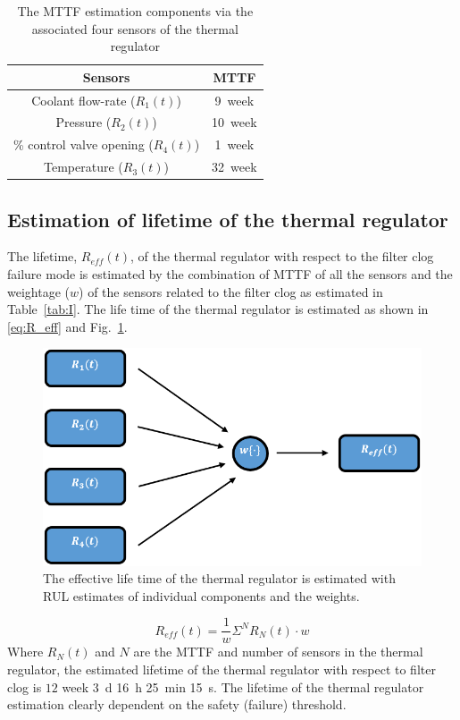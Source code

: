 \documentclass[conference]{IEEEtran}
\begin{document}
\begin{table}[b]
    \caption{The MTTF estimation components via the associated four sensors of the thermal regulator}
    \begin{center}
        \begin{tabular}{|c|c|}
            \hline
            \textbf{Sensors}& \textbf{MTTF} \\
            \hline
            Coolant flow-rate ($R_1(t)$) & \num{9}~week  \\
            \hline
            Pressure ($R_2(t)$) & \num{10}~week \\
            \hline
            \% control valve opening ($R_4(t)$) & \num{1}~week \\
            \hline
            Temperature ($R_3(t)$) & \num{32}~week \\
            \hline
        \end{tabular}
        \label{tab:III}
    \end{center}
\end{table}

\subsection{Estimation of lifetime of the thermal regulator}
\label{subsec:Lifetime}
The lifetime, $R_{eff} (t)$, of the thermal regulator with respect to the filter clog failure mode is estimated by the combination of MTTF of all the sensors and the weightage ($w$) of the sensors related to the filter clog as estimated in Table~\ref{tab:I}. The life time of the thermal regulator is estimated as shown in \eqref{eq:R_eff} and Fig.~\ref{fig:R_eff}.
\begin{figure}[tbp]
\centerline{\includegraphics[width=\linewidth]{R_eff.png}}
\caption{The effective life time of the thermal regulator is estimated with RUL estimates of individual components and the weights.}
\label{fig:R_eff}
\end{figure}
\begin{equation}
    R_{eff}(t) = \frac{1}{w}\Sigma^N R_N(t)\cdot w
    \label{eq:R_eff}
\end{equation}
Where $R_N (t)$ and $N$ are the MTTF and number of sensors in the thermal regulator, the estimated lifetime of the thermal regulator with respect to filter clog is $12$ week \SI{3}{\day} \SI{16}{\hour} \SI{25}{\minute} \SI{15}{\second}. The lifetime of the thermal regulator estimation clearly dependent on the safety (failure) threshold.
\end{document}
